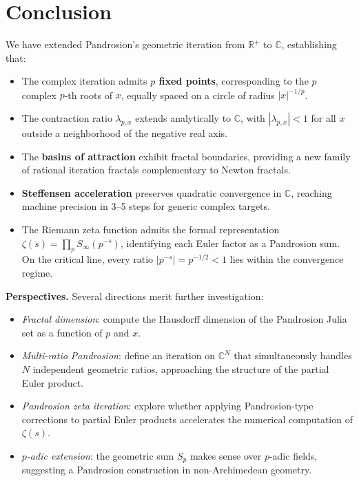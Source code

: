 \documentclass[11pt,a4paper]{article}
\theoremstyle{definition}
\newcommand{\CC}{\mathbb{C}}
\newcommand{\RR}{\mathbb{R}}
\begin{document}
\section{Conclusion}
\label{sec:conclusion_complex}

We have extended Pandrosion's geometric iteration from $\RR^+$ to $\CC$, establishing that:

\begin{itemize}
  \item The complex iteration admits \textbf{$p$ fixed points}, corresponding to the $p$ complex $p$-th roots of $x$, equally spaced on a circle of radius $|x|^{-1/p}$.
  \item The contraction ratio $\lambda_{p,x}$ extends analytically to $\CC$, with $|\lambda_{p,x}| < 1$ for all $x$ outside a neighborhood of the negative real axis.
  \item The \textbf{basins of attraction} exhibit fractal boundaries, providing a new family of rational iteration fractals complementary to Newton fractals.
  \item \textbf{Steffensen acceleration} preserves quadratic convergence in $\CC$, reaching machine precision in 3--5 steps for generic complex targets.
  \item The Riemann zeta function admits the formal representation $\zeta(s) = \prod_p S_\infty(p^{-s})$, identifying each Euler factor as a Pandrosion sum.  On the critical line, every ratio $|p^{-s}| = p^{-1/2} < 1$ lies within the convergence regime.
\end{itemize}

\medskip

\textbf{Perspectives.}
Several directions merit further investigation:
\begin{itemize}
  \item \emph{Fractal dimension}: compute the Hausdorff dimension of the Pandrosion Julia set as a function of $p$ and $x$.
  \item \emph{Multi-ratio Pandrosion}: define an iteration on $\CC^N$ that simultaneously handles $N$ independent geometric ratios, approaching the structure of the partial Euler product.
  \item \emph{Pandrosion zeta iteration}: explore whether applying Pandrosion-type corrections to partial Euler products accelerates the numerical computation of $\zeta(s)$.
  \item \emph{$p$-adic extension}: the geometric sum $S_p$ makes sense over $p$-adic fields, suggesting a Pandrosion construction in non-Archimedean geometry.
\end{itemize}
\end{document}
